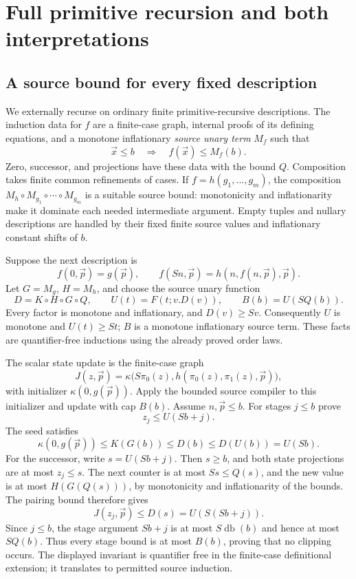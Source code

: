 \section{Full primitive recursion and both interpretations}
\label{sec:selfseed-equivalence}

\subsection{A source bound for every fixed description}
We externally recurse on ordinary finite primitive-recursive
descriptions. The induction data for $f$ are a finite-case graph,
internal proofs of its defining equations, and a monotone inflationary
\emph{source unary term} $M_f$ such that
\[
              \vec x\le b\quad\Longrightarrow\quad f(\vec x)\le M_f(b).
\]
Zero, successor, and projections have these data with the bound $Q$.
Composition takes finite common refinements of cases. If
$f=h(g_1,\ldots,g_m)$, the composition
$M_h\circ M_{g_1}\circ\cdots\circ M_{g_m}$ is a suitable source
bound: monotonicity and inflationarity make it dominate each needed
intermediate argument. Empty tuples and nullary descriptions are
handled by their fixed finite source values and inflationary constant
shifts of $b$.

Suppose the next description is
\[
f(0,\vec p)=g(\vec p),\qquad
f(Sn,\vec p)=h(n,f(n,\vec p),\vec p).
\]
Let $G=M_g$, $H=M_h$, and choose the source unary function
\[
D=K\circ H\circ G\circ Q,\qquad
U(t)=F(t;v.D(v)),\qquad B(b)=U(SQ(b)).
\]
Every factor is monotone and inflationary, and $D(v)\ge Sv$.
Consequently $U$ is monotone and $U(t)\ge St$; $B$ is a monotone
inflationary source term. These facts are quantifier-free inductions
using the already proved order laws.

The scalar state update is the finite-case graph
\[
 J(z,\vec p)=\kappa\bigl(S\pi_0(z),
                    h(\pi_0(z),\pi_1(z),\vec p)\bigr),
\]
with initializer $\kappa(0,g(\vec p))$. Apply the bounded source
compiler to this initializer and update with cap $B(b)$. Assume
$n,\vec p\le b$. For stages $j\le b$ prove
\[
                          z_j\le U(Sb+j).
 \tag{PR-stage}
\]
The seed satisfies
\[
\kappa(0,g(\vec p))\le K(G(b))\le D(b)
                         \le D(U(b))=U(Sb).
\]
For the successor, write $s=U(Sb+j)$. Then $s\ge b$, and both
state projections are at most $z_j\le s$. The next counter is
at most $Ss\le Q(s)$, and the new value is at most
$H(G(Q(s)))$, by monotonicity and inflationarity of the bounds.
The pairing bound therefore gives
\[
                   J(z_j,\vec p)\le D(s)=U(S(Sb+j)).
\]
Since $j\le b$, the stage argument $Sb+j$ is at most
$S\operatorname{db}(b)$ and hence at most $SQ(b)$. Thus every
stage bound is at most $B(b)$, proving that no clipping occurs.
The displayed invariant is quantifier free in the finite-case
definitional extension; it translates to permitted source induction.

